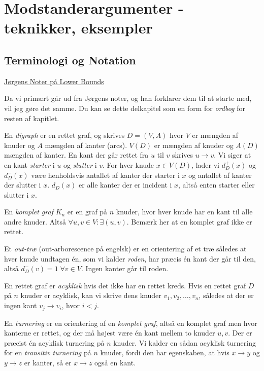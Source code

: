 \chapter{Modstanderargumenter - teknikker, eksempler}

\section{Terminologi og Notation}%
\label{sec:terminologi}

\begin{note}[Kilder]
  \href{https://imada.sdu.dk/u/jbj/DM553/LBnoteJBJ21.pdf}{Jørgens Noter på Lower Bounds}
\end{note}

Da vi primært går ud fra Jørgens noter, og han forklarer dem til at starte med, vil jeg gøre det samme. Du kan se dette delkapitel som en form for \textit{ordbog} for resten af kapitlet.

En \textit{digraph} er en rettet graf, og skrives $D = (V,A)$ hvor $V$ er mængden af knuder og $A$ mængden af kanter (arcs). $V(D)$ er mængden af knuder og $A(D)$ mængden af kanter. En kant der går rettet fra $u$ til $v$ skrives $u \rightarrow v$. Vi siger at en kant \textit{starter} i $u$ og \textit{slutter} i $v$. For hver knude $x \in V(D)$, lader vi $d^{+}_{D}(x)$ og $d^{-}_{D}(x)$ være henholdsvis antallet af kanter der starter i $x$ og antallet af kanter der slutter i $x$. $d_{D}(x)$ er alle kanter der er incident i $x$, altså enten starter eller slutter i $x$.

En \textit{komplet graf} $K_{n}$ er en graf på $n$ knuder, hvor hver knude har en kant til alle andre knuder. Altså \(\forall u, v \in V : \exists (u,v)\). Bemærk her at en komplet graf ikke er rettet.

Et \textit{out-træ} (out-arborescence på engelsk) er en orientering af et træ således at hver knude undtagen én, som vi kalder \textit{roden}, har præcis én kant der går til den, altså $d_{D}^{-}(v) = 1 \; \forall v \in V$. Ingen kanter går til roden.

En rettet graf er \textit{acyklisk} hvis det ikke har en rettet kreds. Hvis en rettet graf $D$ på $n$ knuder er acyklisk, kan vi skrive dens knuder $v_{1}, v_{2}, \ldots, v_{n}$, således at der er ingen kant $v_{j} \rightarrow v_{i}$, hvor $i < j$.

En \textit{turnering} er en orientering af en \textit{komplet graf}, altså en komplet graf men hvor kanterne er rettet, og der må højest være én kant mellem to knuder $u, v$. Der er præcist én acyklisk turnering på $n$ knuder. Vi kalder en sådan acyklisk turnering for en \textit{transitiv turnering} på $n$ knuder, fordi den har egenskaben, at hvis $x \rightarrow y$ og $y \rightarrow z$ er kanter, så er $x \rightarrow z$ også en kant.



